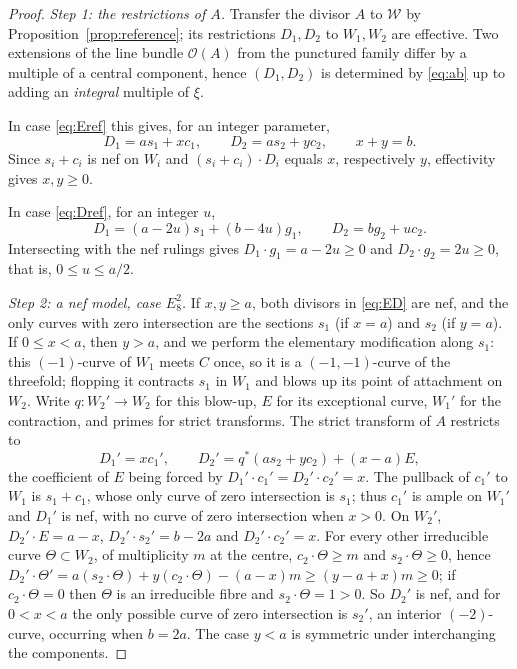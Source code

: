 \documentclass[11pt]{article}
\newcommand{\calW}{\mathcal W}
\theoremstyle{definition}
\theoremstyle{remark}
\begin{document}
\begin{proof}
\emph{Step 1: the restrictions of \(A\).}
Transfer the divisor \(A\) to \(\calW\) by
Proposition~\ref{prop:reference}; its restrictions \(D_1,D_2\) to
\(W_1,W_2\) are effective. Two extensions of the line bundle
\(\mathcal O(A)\) from the punctured family differ by a multiple of a
central component, hence \((D_1,D_2)\) is determined by \eqref{eq:ab} up to
adding an \emph{integral} multiple of \(\xi\).

In case \eqref{eq:Eref} this gives, for an integer parameter,
\begin{equation}\label{eq:ED}
 D_1=as_1+xc_1,\qquad D_2=as_2+yc_2,\qquad x+y=b .
\end{equation}
Since \(s_i+c_i\) is nef on \(W_i\) and \((s_i+c_i)\cdot D_i\) equals
\(x\), respectively \(y\), effectivity gives \(x,y\geq0\).

In case \eqref{eq:Dref}, for an integer \(u\),
\begin{equation}\label{eq:DD}
 D_1=(a-2u)s_1+(b-4u)g_1,\qquad D_2=bg_2+uc_2 .
\end{equation}
Intersecting with the nef rulings gives \(D_1\cdot g_1=a-2u\geq0\) and
\(D_2\cdot g_2=2u\geq0\), that is, \(0\leq u\leq a/2\).

\emph{Step 2: a nef model, case \(E_8^2\).}
If \(x,y\geq a\), both divisors in \eqref{eq:ED} are nef, and the
only curves with zero intersection are the sections \(s_1\) (if
\(x=a\)) and \(s_2\) (if \(y=a\)). If \(0\leq x<a\), then \(y>a\), and
we perform the elementary modification along \(s_1\): this
\((-1)\)-curve of \(W_1\) meets \(C\) once, so it is a
\((-1,-1)\)-curve of the threefold; flopping it contracts \(s_1\) in
\(W_1\) and blows up its point of attachment on \(W_2\). Write
\(q\colon W_2'\to W_2\) for this blow-up, \(E\) for its exceptional
curve, \(W_1'\) for the contraction, and primes for strict transforms.
The strict transform of \(A\) restricts to
\begin{equation}\label{eq:flop}
 D_1'=xc_1',\qquad D_2'=q^*(as_2+yc_2)+(x-a)E ,
\end{equation}
the coefficient of \(E\) being forced by
\(D_1'\cdot c_1'=D_2'\cdot c_2'=x\). The pullback of \(c_1'\) to \(W_1\) is \(s_1+c_1\), whose only curve
of zero intersection is \(s_1\); thus \(c_1'\) is ample on \(W_1'\)
and \(D_1'\) is nef, with no curve of zero intersection when \(x>0\).
On \(W_2'\), \(D_2'\cdot E=a-x\), \(D_2'\cdot s_2'=b-2a\) and
\(D_2'\cdot c_2'=x\). For every other irreducible curve \(\Theta\subset W_2\), of
multiplicity \(m\) at the centre, \(c_2\cdot\Theta\geq m\) and
\(s_2\cdot\Theta\geq0\), hence
\(D_2'\cdot\Theta'=a(s_2\cdot\Theta)+y(c_2\cdot\Theta)-(a-x)m\geq
(y-a+x)m\geq0\); if \(c_2\cdot\Theta=0\) then \(\Theta\) is an
irreducible fibre and \(s_2\cdot\Theta=1>0\). So \(D_2'\) is nef, and
for \(0<x<a\) the only possible curve of zero intersection is
\(s_2'\), an interior \((-2)\)-curve, occurring when \(b=2a\). The case
\(y<a\) is symmetric under interchanging the components.


\end{proof}
\end{document}
